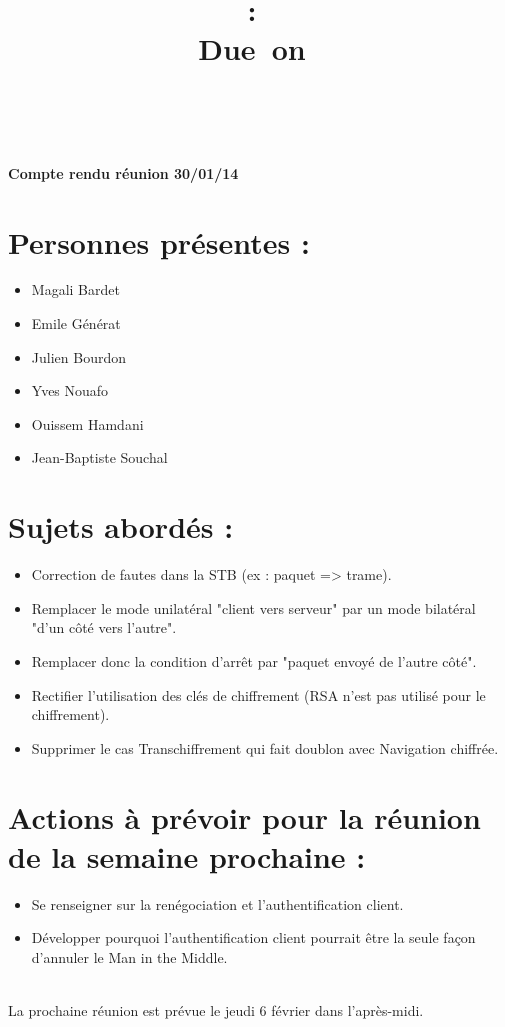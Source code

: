 \documentclass[a4paper,11pt,french]{article}
\title{
\vspace{2in}
\textmd{\textbf{\hmwkClass :\ \hmwkTitle}}\\
\normalsize\vspace{0.1in}\small{Due\ on\ \hmwkDueDate}\\
\vspace{0.1in}\large{\textit{\hmwkClassInstructor\ \hmwkClassTime}}
\vspace{3in}
}
\author{\hmwkAuthorName}
\date{} %
\newcommand{\hmwkDocName}{Compte rendu réunion 30/01/14} %
\begin{document}
\newcount\startdate
\newcount\daynum
\pagestyle{fancy}

\vspace*{5cm}
\begin{center}\textbf{\Huge{\hmwkDocName}}\end{center}
\vspace*{4.5cm}

\newpage




\section{Personnes présentes :}
\begin{itemize}
  \item Magali Bardet
  \item Emile Générat
  \item Julien Bourdon
  \item Yves Nouafo
  \item Ouissem Hamdani
  \item Jean-Baptiste Souchal
\end{itemize}

\section{Sujets abordés :}
\begin{itemize}
  \item Correction de fautes dans la STB (ex : paquet => trame).
  \item Remplacer le mode unilatéral "client vers serveur" par un mode bilatéral "d'un côté vers l'autre". 
  \item Remplacer donc la condition d'arrêt par "paquet envoyé de l'autre côté".
  \item Rectifier l'utilisation des clés de chiffrement (RSA n'est pas utilisé pour le chiffrement).
  \item Supprimer le cas Transchiffrement qui fait doublon avec Navigation chiffrée.
\end{itemize}

\section{Actions à prévoir pour la réunion de la semaine prochaine :}
\begin{itemize}
  \item Se renseigner sur la renégociation et l'authentification client. 
  \item Développer pourquoi l'authentification client pourrait être la seule façon d'annuler le Man in the Middle.
\end{itemize}
~\\
La prochaine réunion est prévue le jeudi 6 février dans l'après-midi.
\end{document}
